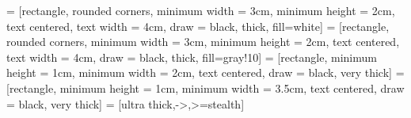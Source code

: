 \documentclass{article}
\begin{document}
   = [rectangle, rounded corners, minimum width = 3cm, minimum height = 2cm, text centered, text width = 4cm, draw = black, thick, fill=white]
   = [rectangle, rounded corners, minimum width = 3cm, minimum height = 2cm, text centered, text width = 4cm, draw = black, thick, fill=gray!10]
   = [rectangle, minimum height = 1cm, minimum width = 2cm, text centered, draw = black, very thick]
   = [rectangle, minimum height = 1cm, minimum width = 3.5cm, text centered, draw = black, very thick]
   = [ultra thick,->,>=stealth]

\begin{preview}
\end{preview}
\end{document}
